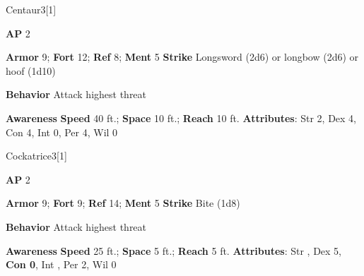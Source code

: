 \begin{monsection}{Centaur}{3}[1]
\vspace{-1em}\vspace{-1em}
\begin{spellcontent}
\begin{spelltargetinginfo}
{\textbf{AP} 2}

\pari \textbf{Armor} 9;
\textbf{Fort} 12;
\textbf{Ref} 8;
\textbf{Ment} 5
\pari \textbf{Strike} Longsword  (2d6) or longbow  (2d6) or hoof  (1d10)



\pari \textbf{Behavior} Attack highest threat
\end{spelltargetinginfo}
\end{spellcontent}

\begin{monsterfooter}
\pari \textbf{Awareness} 
\pari \textbf{Speed} 40 ft.;
\textbf{Space} 10 ft.;
\textbf{Reach} 10 ft.
\pari \textbf{Attributes}:
Str 2,
Dex 4,
Con 4,
Int 0,
Per 4,
Wil 0
\end{monsterfooter}
\end{monsection}

\begin{monsection}{Cockatrice}{3}[1]
\vspace{-1em}\vspace{-1em}
\begin{spellcontent}
\begin{spelltargetinginfo}
{\textbf{AP} 2}

\pari \textbf{Armor} 9;
\textbf{Fort} 9;
\textbf{Ref} 14;
\textbf{Ment} 5
\pari \textbf{Strike} Bite  (1d8)



\pari \textbf{Behavior} Attack highest threat
\end{spelltargetinginfo}
\end{spellcontent}

\begin{monsterfooter}
\pari \textbf{Awareness} 
\pari \textbf{Speed} 25 ft.;
\textbf{Space} 5 ft.;
\textbf{Reach} 5 ft.
\pari \textbf{Attributes}:
Str ,
Dex 5,
\textbf{Con 0},
Int ,
Per 2,
Wil 0
\end{monsterfooter}
\end{monsection}


